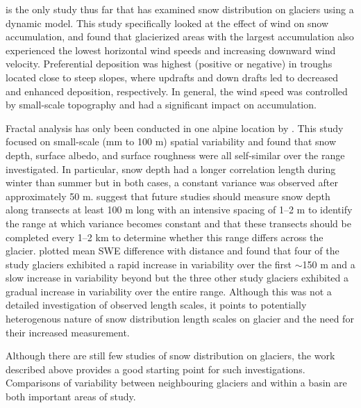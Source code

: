\documentclass{sfuthesis}
\begin{document}
\cite{Dadic2010} is the only study thus far that has examined snow distribution on glaciers using a dynamic model. This study specifically looked at the effect of wind on snow accumulation, and found that glacierized areas with the largest accumulation also experienced the lowest horizontal wind speeds and increasing downward wind velocity. Preferential deposition was highest (positive or negative) in troughs located close to steep slopes, where updrafts and down drafts led to decreased and enhanced deposition, respectively. In general, the wind speed was controlled by small-scale topography and had a significant impact on accumulation. 

Fractal analysis has only been conducted in one alpine location by \cite{Arnold2003}. This study focused on small-scale (mm to 100 m) spatial variability and found that snow depth, surface albedo, and surface roughness were all self-similar over the range investigated. In particular, snow depth had a longer correlation length during winter than summer but in both cases, a constant variance was observed after approximately 50 m.  \cite{Arnold2003} suggest that future studies should measure snow depth along transects at least 100 m long with an intensive spacing of 1--2 m to identify the range at which variance becomes constant and that these transects should be completed every 1--2 km to determine whether this range differs across the glacier. \cite{McGrath2015} plotted mean SWE difference with distance and found that four of the study glaciers exhibited a rapid increase in variability over the first $\sim$150 m and a slow increase in variability beyond but the three other study glaciers exhibited a gradual increase in variability over the entire range. Although this was not a detailed investigation of observed length scales, it points to potentially heterogenous nature of snow distribution length scales on glacier and the need for their increased measurement.

Although there are still few studies of snow distribution on glaciers, the work described above provides a good starting point for such investigations. Comparisons of variability between neighbouring glaciers and within a basin are both important areas of study.
\end{document}
